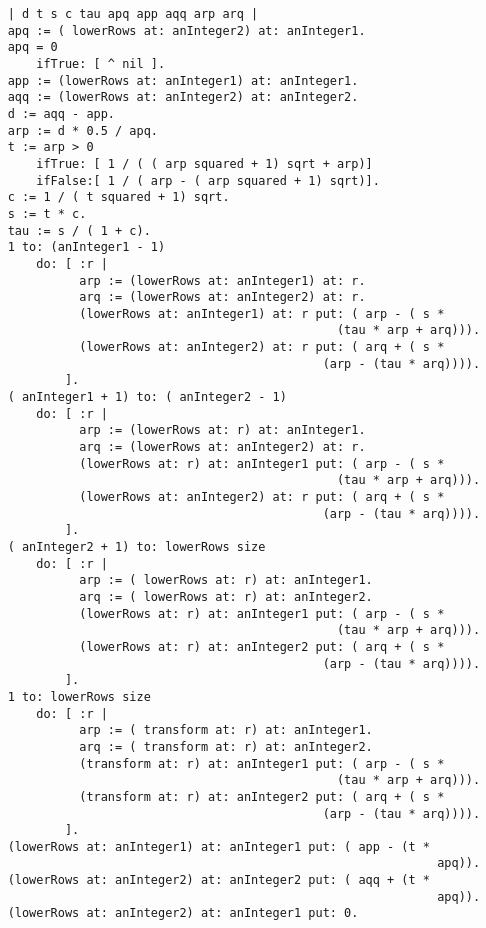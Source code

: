 \begin{verbatim}
    | d t s c tau apq app aqq arp arq |
    apq := ( lowerRows at: anInteger2) at: anInteger1.
    apq = 0
        ifTrue: [ ^ nil ].
    app := (lowerRows at: anInteger1) at: anInteger1.
    aqq := (lowerRows at: anInteger2) at: anInteger2.
    d := aqq - app.
    arp := d * 0.5 / apq.
    t := arp > 0 
        ifTrue: [ 1 / ( ( arp squared + 1) sqrt + arp)]
        ifFalse:[ 1 / ( arp - ( arp squared + 1) sqrt)].
    c := 1 / ( t squared + 1) sqrt.
    s := t * c.
    tau := s / ( 1 + c).
    1 to: (anInteger1 - 1)
        do: [ :r |
              arp := (lowerRows at: anInteger1) at: r.
              arq := (lowerRows at: anInteger2) at: r.
              (lowerRows at: anInteger1) at: r put: ( arp - ( s * 
                                                  (tau * arp + arq))).
              (lowerRows at: anInteger2) at: r put: ( arq + ( s * 
                                                (arp - (tau * arq)))).
            ].
    ( anInteger1 + 1) to: ( anInteger2 - 1)
        do: [ :r |
              arp := (lowerRows at: r) at: anInteger1.
              arq := (lowerRows at: anInteger2) at: r.
              (lowerRows at: r) at: anInteger1 put: ( arp - ( s * 
                                                  (tau * arp + arq))).
              (lowerRows at: anInteger2) at: r put: ( arq + ( s * 
                                                (arp - (tau * arq)))).
            ].
    ( anInteger2 + 1) to: lowerRows size
        do: [ :r |
              arp := ( lowerRows at: r) at: anInteger1.
              arq := ( lowerRows at: r) at: anInteger2.
              (lowerRows at: r) at: anInteger1 put: ( arp - ( s * 
                                                  (tau * arp + arq))).
              (lowerRows at: r) at: anInteger2 put: ( arq + ( s * 
                                                (arp - (tau * arq)))).
            ].
    1 to: lowerRows size
        do: [ :r |
              arp := ( transform at: r) at: anInteger1.
              arq := ( transform at: r) at: anInteger2.
              (transform at: r) at: anInteger1 put: ( arp - ( s * 
                                                  (tau * arp + arq))).
              (transform at: r) at: anInteger2 put: ( arq + ( s * 
                                                (arp - (tau * arq)))).
            ].
    (lowerRows at: anInteger1) at: anInteger1 put: ( app - (t * 
                                                                apq)).
    (lowerRows at: anInteger2) at: anInteger2 put: ( aqq + (t * 
                                                                apq)).
    (lowerRows at: anInteger2) at: anInteger1 put: 0.
\end{verbatim}

